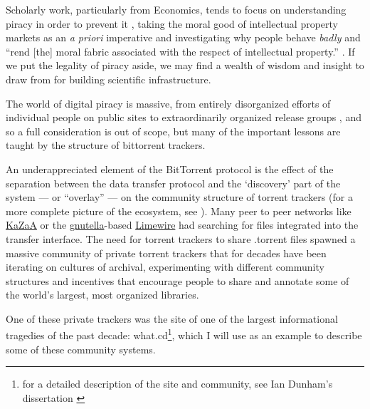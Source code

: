 \documentclass[10pt]{tufte-book}
\begin{document}
Scholarly work, particularly from Economics, tends to focus on
understanding piracy in order to prevent it\citep{basamanowiczReleaseGroupsDigital2011, hindujaDeindividuationInternetSoftware2008} , taking the moral good
of intellectual property markets as an \emph{a priori} imperative and
investigating why people behave \emph{badly} and ``rend {[}the{]} moral
fabric associated with the respect of intellectual property.'' \citep{hindujaDeindividuationInternetSoftware2008} . If we put the legality
of piracy aside, we may find a wealth of wisdom and insight to draw from
for building scientific infrastructure.

The world of digital piracy is massive, from entirely disorganized
efforts of individual people on public sites to extraordinarily
organized release groups \citep{basamanowiczReleaseGroupsDigital2011} , and so a full consideration is out of scope, but many of the
important lessons are taught by the structure of bittorrent trackers.

An underappreciated element of the BitTorrent protocol is the effect of
the separation between the data transfer protocol and the `discovery'
part of the system --- or ``overlay'' --- on the community structure of
torrent trackers (for a more complete picture of the ecosystem, see \citep{zhangUnravelingBitTorrentEcosystem2011} ). Many peer to peer
networks like \href{https://en.wikipedia.org/wiki/Kazaa}{KaZaA} or the
\href{https://en.wikipedia.org/wiki/Gnutella}{gnutella}-based
\href{https://en.wikipedia.org/wiki/LimeWire}{Limewire} had searching
for files integrated into the transfer interface. The need for torrent
trackers to share .torrent files spawned a massive community of private
torrent trackers that for decades have been iterating on cultures of
archival, experimenting with different community structures and
incentives that encourage people to share and annotate some of the
world's largest, most organized libraries.

One of these private trackers was the site of one of the largest
informational tragedies of the past decade: what.cd\footnote{for a
  detailed description of the site and community, see Ian Dunham's
  dissertation \citep{dunhamWhatCDLegacy2018} }, which I will use
as an example to describe some of these community systems.
\end{document}

